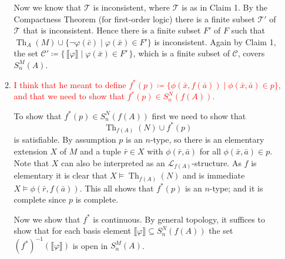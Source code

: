 \documentclass{article}
\theoremstyle{theorem}
\DeclareMathOperator{\Th}{Th}
\begin{document}
\begin{enumerate}[leftmargin=*]
\begin{enumerate}
			Now we know that $\mathcal{T}$ is inconsistent, where $\mathcal{T}$ is as in Claim 1. By the Compactness Theorem (for first-order logic) there is a finite subset $\mathcal{T}'$ of $\mathcal{T}$ that is inconsistent. Hence there is a finite subset $F'$ of $F$ such that $\Th_A(M)\cup \{\neg\varphi(\bar{c}) \mid \varphi(\bar{x})\in F'\}$ is inconsistent. Again by Claim 1, the set $\mathcal{C}'\coloneqq \{\,\llbracket\varphi\rrbracket \mid \varphi(\bar{x}) \in F'\,\}$, which is a finite subset of $\mathcal{C}$, covers $S_n^M(A)$.
			\item \textcolor{red}{I think that he meant to define $f^*(p)\coloneqq \{\phi(\bar{x},f(\bar{a}))\mid \phi(\bar{x},\bar{a})\in p\}$, and that we need to show that $f^*(p)\in S_n^N(f(A))$.}
			
			To show that $f^*(p)\in S_n^N(f(A))$ first we need to show that 
			\[
				\Th_{f(A)}(N) \cup f^*(p)
			\]
			is satisfiable. By assumption $p$ is an $n$-type, so there is an elementary extension $X$ of $M$ and a tuple $\bar{r}\in X$ with $\phi(\bar{r},\bar{a})$ for all $\phi(\bar{x},\bar{a})\in p$. Note that $X$ can also be interpreted as an $\mathcal{L}_{f(A)}$-structure. As $f$ is elementary it is clear that $X\models \Th_{f(A)}(N)$ and is immediate $X\models \phi(\bar{r},f(\bar{a}))$. This all shows that $f^*(p)$ is an $n$-type; and it is complete since $p$ is complete.
			
			Now we show that $f^*$ is continuous. By general topology, it suffices to show that for each basis element $\llbracket \varphi\rrbracket\subseteq S_n^{N}(f(A))$ the set $(f^*)^{-1}(\llbracket \varphi\rrbracket)$ is open in $S_n^M(A)$.
			

\end{enumerate}
\end{enumerate}
\end{document}
